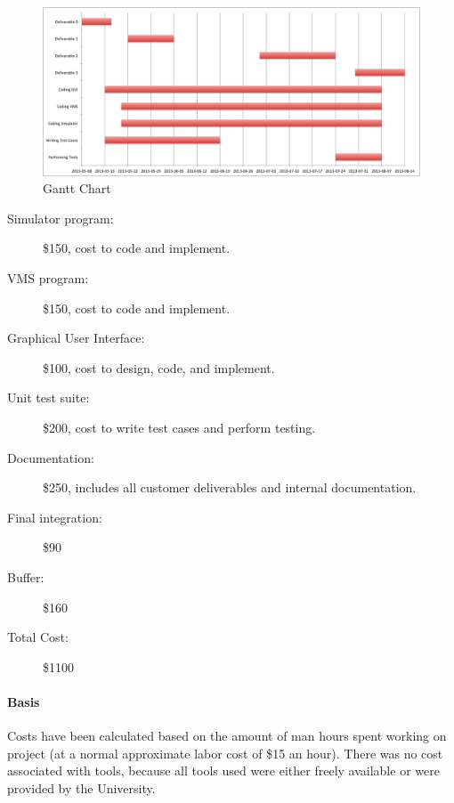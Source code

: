 \documentclass{article}
\begin{document}
\begin{figure}[!htb]
\caption{Gantt Chart}
\centering
\includegraphics[scale=0.55]{charts/GanttChart.png}
\end{figure}

\begin{description}
  \item[Simulator program:] \$150, cost to code and implement.
  \item[VMS program:] \$150, cost to code and implement.
  \item[Graphical User Interface:] \$100, cost to design, code, and implement.
  \item[Unit test suite:] \$200, cost to write test cases and perform testing.
  \item[Documentation:] \$250, includes all customer deliverables and internal documentation.
  \item[Final integration:] \$90
  \item[Buffer:] \$160
  \item[Total Cost:] \$1100
\end{description}

\paragraph{Basis} Costs have been calculated based on the amount of man hours spent working on project (at a normal approximate labor cost of \$15 an hour). There was no cost associated with tools, because all tools used were either freely available or were provided by the University.
\end{document}
